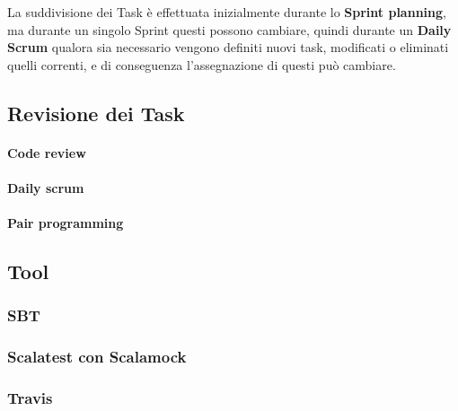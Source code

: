 La suddivisione dei Task è effettuata inizialmente durante lo \textbf{Sprint planning}, ma durante un singolo Sprint questi possono cambiare, quindi durante un \textbf{Daily Scrum} qualora sia necessario  vengono definiti nuovi task, modificati o eliminati quelli correnti, e di conseguenza l'assegnazione di questi può cambiare.

\subsection{Revisione dei Task}

\paragraph{Code review}

\paragraph{Daily scrum}

\paragraph{Pair programming}

\subsection{Tool}

\subsubsection{SBT}

\subsubsection{Scalatest con Scalamock} %

\subsubsection{Travis}